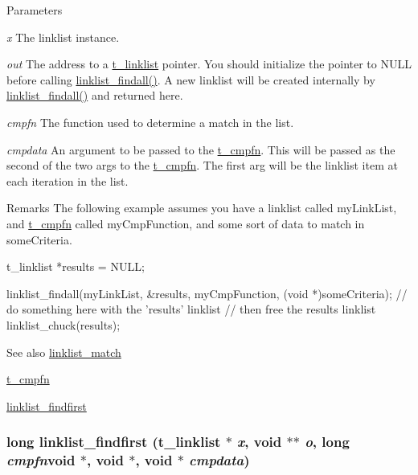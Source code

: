 \begin{DoxyParams}{Parameters}
\item[{\em x}]The linklist instance. \item[{\em out}]The address to a \hyperlink{structt__linklist}{t\_\-linklist} pointer. You should initialize the pointer to NULL before calling \hyperlink{group__linklist_ga20253bd1c04d260171435d6b547ac787}{linklist\_\-findall()}. A new linklist will be created internally by \hyperlink{group__linklist_ga20253bd1c04d260171435d6b547ac787}{linklist\_\-findall()} and returned here. \item[{\em cmpfn}]The function used to determine a match in the list. \item[{\em cmpdata}]An argument to be passed to the \hyperlink{group__datastore_gaaf4ae6dd800a2be9abd645cf70aeb38f}{t\_\-cmpfn}. This will be passed as the second of the two args to the \hyperlink{group__datastore_gaaf4ae6dd800a2be9abd645cf70aeb38f}{t\_\-cmpfn}. The first arg will be the linklist item at each iteration in the list.\end{DoxyParams}
\begin{DoxyRemark}{Remarks}
The following example assumes you have a linklist called myLinkList, and \hyperlink{group__datastore_gaaf4ae6dd800a2be9abd645cf70aeb38f}{t\_\-cmpfn} called myCmpFunction, and some sort of data to match in someCriteria. 
\begin{DoxyCode}
    t_linklist *results = NULL;
    
    linklist_findall(myLinkList, &results, myCmpFunction, (void *)someCriteria);
    // do something here with the 'results' linklist
    // then free the results linklist
    linklist_chuck(results);
\end{DoxyCode}

\end{DoxyRemark}
\begin{DoxySeeAlso}{See also}
\hyperlink{group__linklist_ga2a991fb645404fe7d9d3327e5a386b80}{linklist\_\-match} 

\hyperlink{group__datastore_gaaf4ae6dd800a2be9abd645cf70aeb38f}{t\_\-cmpfn} 

\hyperlink{group__linklist_gab7f3c26cb704c460892818b89a1ab004}{linklist\_\-findfirst} 
\end{DoxySeeAlso}
\hypertarget{group__linklist_gab7f3c26cb704c460892818b89a1ab004}{
\subsubsection[{linklist\_\-findfirst}]{\setlength{\rightskip}{0pt plus 5cm}long linklist\_\-findfirst ({\bf t\_\-linklist} $\ast$ {\em x}, \/  void $\ast$$\ast$ {\em o}, \/  long  {\em cmpfn}void $\ast$, void $\ast$, \/  void $\ast$ {\em cmpdata})}}
\label{group__linklist_gab7f3c26cb704c460892818b89a1ab004}


